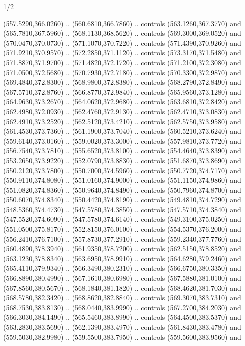 \begin{flagdescription}{1/2}
\begin{scope}[xshift=0.5\flaglength,yshift=0.5\flagwidth,scale=\flagwidth/759]
\begin{scope}[y=0.8pt, x=0.8pt, yscale=-1,shift={(-720,-480)}]
\begin{scope}[cm={{1.14637,0.0,0.0,1.17117,(33.17849,82.1384)}}]
  (557.5290,366.0260) .. (560.6810,366.7860) .. controls (563.1260,367.3770) and
  (565.7810,367.5960) .. (568.1130,368.5620) .. controls (569.3000,369.0520) and
  (570.0470,370.0730) .. (571.1070,370.7220) .. controls (571.4390,370.9260) and
  (571.9210,370.9570) .. (572.2850,371.1120) .. controls (573.3170,371.5480) and
  (571.8870,371.9700) .. (571.4820,372.1720) .. controls (571.2100,372.3080) and
  (571.0500,372.5680) .. (570.7930,372.7180) .. controls (570.3300,372.9870) and
  (569.4840,372.8300) .. (568.9800,372.8380) .. controls (568.2790,372.8490) and
  (567.5710,372.8760) .. (566.8770,372.9840) .. controls (565.9560,373.1280) and
  (564.9630,373.2670) .. (564.0620,372.9680) .. controls (563.6810,372.8420) and
  (562.4980,372.0930) .. (562.4760,372.9130) .. controls (562.4710,373.0830) and
  (562.4910,373.2520) .. (562.5120,373.4210) .. controls (562.5750,373.9580) and
  (561.4530,373.7360) .. (561.1900,373.7040) .. controls (560.5210,373.6240) and
  (559.6140,373.0160) .. (559.0020,373.3000) .. controls (557.9810,373.7720) and
  (556.7540,373.7810) .. (555.6520,373.8100) .. controls (554.4640,373.8390) and
  (553.2650,373.9220) .. (552.0790,373.8830) .. controls (551.6870,373.8690) and
  (550.2120,373.7800) .. (550.7000,374.5960) .. controls (550.7720,374.7170) and
  (550.9110,374.8080) .. (551.0160,374.9000) .. controls (551.1150,374.9860) and
  (551.0820,374.8360) .. (550.9640,374.8490) .. controls (550.7960,374.8700) and
  (550.6070,374.8340) .. (550.4420,374.8190) .. controls (549.4810,374.7290) and
  (548.5360,374.4730) .. (547.5780,374.3850) .. controls (547.5710,374.3840) and
  (547.5520,374.6090) .. (547.5780,374.6140) .. controls (549.3100,375.0250) and
  (551.0500,375.8170) .. (552.8150,376.0100) .. controls (554.5370,376.2000) and
  (556.2410,376.7100) .. (557.8730,377.2910) .. controls (559.2340,377.7760) and
  (560.4890,378.3940) .. (561.9350,378.7200) .. controls (562.5150,378.8520) and
  (563.1230,378.8340) .. (563.6950,378.9910) .. controls (564.6280,379.2460) and
  (565.4110,379.9340) .. (566.3490,380.2310) .. controls (566.6750,380.3350) and
  (566.8890,380.4990) .. (567.1610,380.6980) .. controls (567.5880,381.0100) and
  (567.8560,380.5670) .. (568.1840,381.1820) .. controls (568.4620,381.7030) and
  (568.5780,382.3420) .. (568.8620,382.8840) .. controls (569.3070,383.7310) and
  (568.7530,383.8130) .. (568.0440,383.9990) .. controls (567.2700,384.2030) and
  (566.3030,384.1490) .. (565.5460,383.8990) .. controls (564.4500,383.5370) and
  (563.2830,383.5690) .. (562.1390,383.4970) .. controls (561.8430,383.4780) and
  (559.5030,382.9980) .. (559.5500,383.7950) .. controls (559.5600,383.9560) and

\end{scope}
\end{scope}
\end{scope}
\end{flagdescription}

